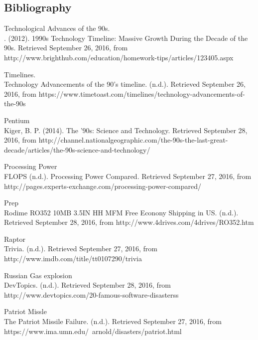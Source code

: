 \documentclass[12ptletterpaper]{paper}
\begin{document}
\begin{flushleft}
		\section{Bibliography}
		\noindent\hypertarget{Technological Advances of the 90s}{Technological Advances of the 90s.\\. (2012). 1990s Technology Timeline: Massive Growth During the Decade of the 90s. Retrieved September 26, 2016, from http://www.brighthub.com/education/homework-tips/articles/123405.aspx} \vspace{12pt}
		
		\noindent\hypertarget{Timelines}{Timelines.\\Technology Advancements of the 90's timeline. (n.d.). Retrieved September 26, 2016, from https://www.timetoast.com/timelines/technology-advancements-of-the-90s} \vspace{12pt}
		
		\noindent\hypertarget{Pentium}{Pentium\\Kiger, B. P. (2014). The '90s: Science and Technology. Retrieved September 28, 2016, from http://channel.nationalgeographic.com/the-90s-the-last-great-decade/articles/the-90s-science-and-technology/} \vspace{12pt}
		
		\noindent\hypertarget{Processing Power}{Processing Power\\FLOPS (n.d.). Processing Power Compared. Retrieved September 27, 2016, from http://pages.experts-exchange.com/processing-power-compared/} \vspace{12pt}
		
		\noindent\hypertarget{Prep}{Prep\\Rodime RO352 10MB 3.5IN HH MFM Free Econony Shipping in US. (n.d.). Retrieved September 28, 2016, from http://www.4drives.com/4drives/RO352.htm} \vspace{12pt}
		
		\noindent\hypertarget{Raptor}{Raptor\\Trivia. (n.d.). Retrieved September 27, 2016, from http://www.imdb.com/title/tt0107290/trivia} \vspace{12pt}
		
		\noindent\hypertarget{Russian Gas explosion}{Russian Gas explosion\\DevTopics. (n.d.). Retrieved September 28, 2016, from http://www.devtopics.com/20-famous-software-disasterss} \vspace{12pt}
		
		\noindent\hypertarget{Patriot Missle}{Patriot Missle\\The Patriot Missile Failure. (n.d.). Retrieved September 27, 2016, from https://www.ima.umn.edu/~arnold/disasters/patriot.html} \vspace{12pt}
		

\end{flushleft}
\end{document}
